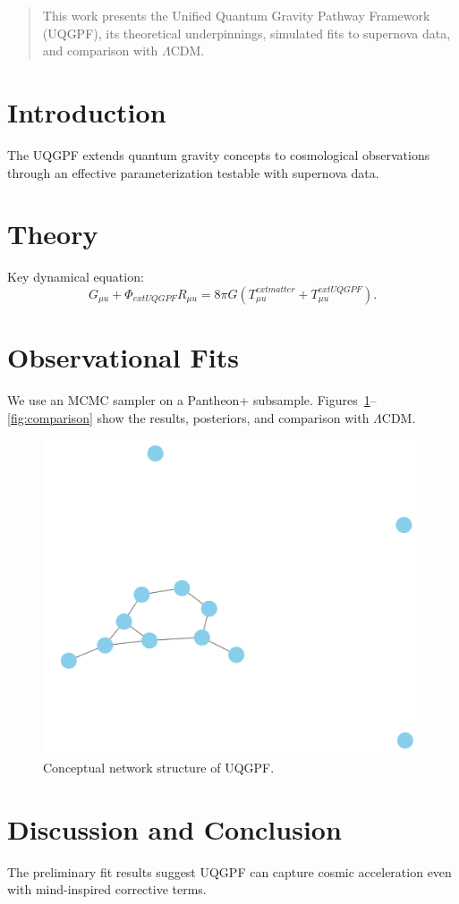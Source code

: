 \documentclass[11pt,a4paper]{article}
\author{Ali Heydari Nezhad}
\date{today}
\begin{document}
\maketitle

\begin{abstract}
This work presents the Unified Quantum Gravity Pathway Framework (UQGPF), 
its theoretical underpinnings, simulated fits to supernova data, 
and comparison with $\Lambda$CDM.
\end{abstract}

\section{Introduction}
The UQGPF extends quantum gravity concepts to cosmological observations 
through an effective parameterization testable with supernova data.

\section{Theory}
Key dynamical equation:
\[ G_{\mu u} + \Phi_{	ext{UQGPF}} R_{\mu u} = 8 \pi G \left( T_{\mu u}^{	ext{matter}} + T_{\mu u}^{	ext{UQGPF}} \right) . \]

\section{Observational Fits}
We use an MCMC sampler on a Pantheon+ subsample. 
Figures~\ref{fig:structure}--\ref{fig:comparison} show 
the results, posteriors, and comparison with $\Lambda$CDM.

\begin{figure}[h]
\centering
\includegraphics[width=0.7	extwidth]{figures/UQGPF_Structure.png}
\caption{Conceptual network structure of UQGPF.}
\label{fig:structure}
\end{figure}

\clearpage
\section{Discussion and Conclusion}
The preliminary fit results suggest UQGPF can capture 
cosmic acceleration even with mind-inspired corrective terms.



\end{document}
